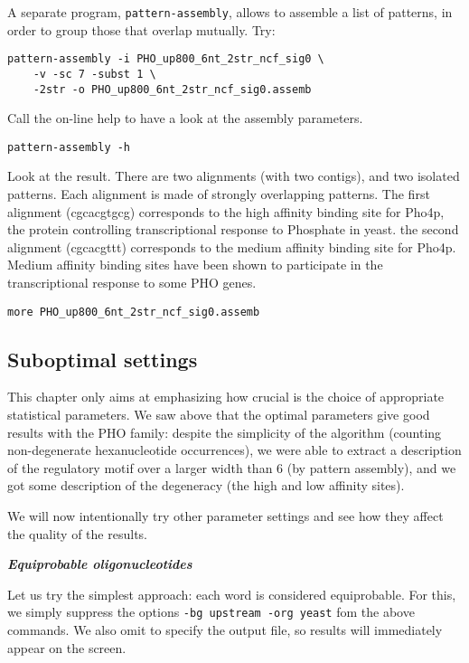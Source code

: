 A separate program, \texttt{pattern-assembly}, allows to assemble a
list of patterns, in order to group those that overlap mutually. Try:

\begin{verbatim}
pattern-assembly -i PHO_up800_6nt_2str_ncf_sig0 \
    -v -sc 7 -subst 1 \
    -2str -o PHO_up800_6nt_2str_ncf_sig0.assemb
\end{verbatim}


Call the on-line help to have a look at the assembly parameters. 
\begin{verbatim}
pattern-assembly -h
\end{verbatim}

Look at the result. There are two alignments (with two contigs), and
two isolated patterns. Each alignment is made of strongly overlapping
patterns. The first alignment (cgcacgtgcg) corresponds to the high
affinity binding site for Pho4p, the protein controlling
transcriptional response to Phosphate in yeast. the second alignment
(cgcacgttt) corresponds to the medium affinity binding site for
Pho4p. Medium affinity binding sites have been shown to participate in
the transcriptional response to some PHO genes.

\begin{verbatim}
more PHO_up800_6nt_2str_ncf_sig0.assemb
\end{verbatim}

\subsection{Suboptimal settings}

This chapter only aims at emphasizing how crucial is the choice of
appropriate statistical parameters. We saw above that the optimal
parameters give good results with the PHO family: despite the
simplicity of the algorithm (counting non-degenerate hexanucleotide
occurrences), we were able to extract a description of the regulatory
motif over a larger width than 6 (by pattern assembly), and we got
some description of the degeneracy (the high and low affinity sites).

We will now intentionally try other parameter settings and see how
they affect the quality of the results.

\textit{\textbf{Equiprobable oligonucleotides}}

Let us try the simplest approach: each word is considered
equiprobable. For this, we simply suppress the options
\texttt{-bg upstream -org yeast} fom the above commands. We
also omit to specify the output file, so results will immediately
appear on the screen.

